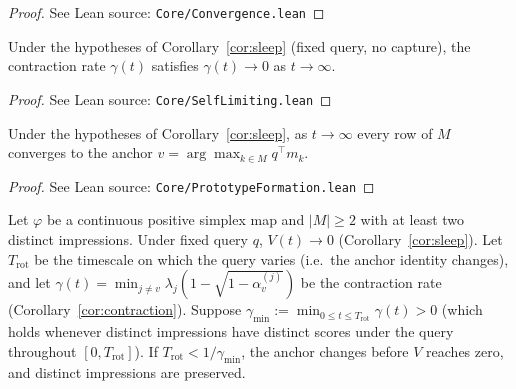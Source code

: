 \begin{proof}
\leanok
{}
See Lean source: \texttt{Core/Convergence.lean}
\end{proof}

\begin{corollary}
\label{cor:selflimiting}
\leanok
{}
Under the hypotheses of Corollary~\ref{cor:sleep} (fixed query, no capture), the contraction rate $\gamma(t)$ satisfies $\gamma(t) \to 0$ as $t \to \infty$.
\end{corollary}

\begin{proof}
\leanok
{}
See Lean source: \texttt{Core/SelfLimiting.lean}
\end{proof}

\begin{corollary}
\label{cor:prototype}
\leanok
{}
Under the hypotheses of Corollary~\ref{cor:sleep}, as $t \to \infty$ every row of $M$ converges to the anchor $v = \arg\max_{k \in M} q^\top m_k$.
\end{corollary}

\begin{proof}
\leanok
{}
See Lean source: \texttt{Core/PrototypeFormation.lean}
\end{proof}

\begin{corollary}
\label{cor:variability}
\leanok
{}
Let $\varphi$ be a continuous positive simplex map and $|M| \geq 2$ with at least two distinct impressions.
Under fixed query $q$, $V(t) \to 0$
(Corollary~\ref{cor:sleep}).  Let $T_{\mathrm{rot}}$ be the timescale
on which the query varies (i.e.\ the anchor identity changes), and let
$\gamma(t) = \min_{j \neq v} \lambda_j(1 - \sqrt{1 - \alpha_v^{(j)}})$
be the contraction rate (Corollary~\ref{cor:contraction}).  Suppose
$\gamma_{\min} := \min_{0 \leq t \leq T_{\mathrm{rot}}} \gamma(t) > 0$
(which holds whenever distinct impressions have distinct scores under
the query throughout $[0, T_{\mathrm{rot}}]$).  If
$T_{\mathrm{rot}} < 1/\gamma_{\min}$, the anchor changes
before $V$ reaches zero, and distinct impressions are preserved.
\end{corollary}

